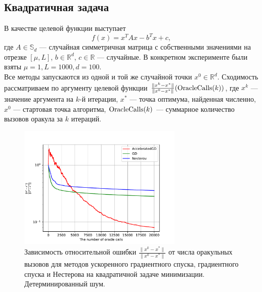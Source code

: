 \documentclass{article}
\begin{document}
\subsection{Квадратичная задача}
В качестве целевой функции выступает
\begin{equation}
 f(x) = x^T A x - b^T x + c,
\end{equation}
где $A \in \mathbb{S}_d$ --- случайная симметричная матрица с собственными значениями на отрезке $[\mu, L]$, $b \in \mathbb{R}^d$, $c \in \mathbb{R}$ --- случайные. В конкретном эксперименте были взяты $\mu = 1, L = 1000, d = 100$.\\
Все методы запускаются из одной и той же случайной точки $x^0 \in \mathbb{R}^d$.
Сходимость рассматриваем по аргументу целевой функции $\frac{\|x^k - x^*\|}{\|x^0 - x^*\|}(\textnormal{OracleCalls}(k))$, где $x^k$ --- значение аргумента на $k$-й итерации, $x^*$ --- точка оптимума, найденная численно, $x^0$ --- стартовая точка алгоритма, $\textnormal{OracleCalls}(k)$ --- суммарное количество вызовов оракула за $k$ итераций.
\begin{figure}[!htbp]
\centering
  \includegraphics[width=0.7\textwidth]{../figures/Deterministic_quadratic_AGD_GD_Nesterov_18.pdf}
 \caption{Зависимость относительной ошибки $\frac{\|x^k - x^*\|}{\|x^0 - x^*\|}$ от числа оракульных вызовов для методов ускоренного градиентного спуска, градиентного спуска и Нестерова на квадратичной задаче минимизации. Детерминированный шум.}
  \label{fig:non-stochastic_logreg}
\end{figure}
\end{document}
